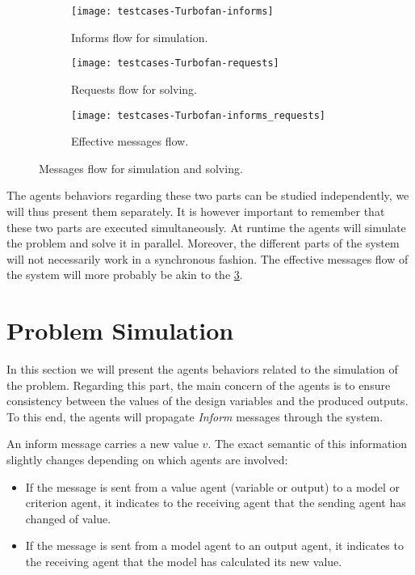 \begin{figure}[h]
	\begin{subfigure}[b]{0.4\textwidth}
		\centering
		\texttt{[image: testcases-Turbofan-informs]}
		\caption{Informs flow for simulation.}\label{messages_flow:inf}
	\end{subfigure}
	\hfill
	\begin{subfigure}[b]{0.4\textwidth}
		\centering
		\texttt{[image: testcases-Turbofan-requests]}
		\caption{Requests flow for solving.}\label{messages_flow:req}
	\end{subfigure}

	\centering
	 \begin{subfigure}[b]{0.4\textwidth}
		\texttt{[image: testcases-Turbofan-informs\_requests]}
		\caption{Effective messages flow.}\label{messages_flow:eff}
	\end{subfigure}
	
	\caption{Messages flow for simulation and solving.}
	\label{messages_flow}

\end{figure}

The agents behaviors regarding these two parts can be studied independently, we will thus present them separately. It is however important to remember that these two parts are executed simultaneously. At runtime the agents will simulate the problem and solve it in parallel. Moreover, the different parts of the system will not necessarily work in a synchronous fashion. The effective messages flow of the system will more probably be akin to the \figurename{} \ref{messages_flow:eff}.

\section{Problem Simulation}

In this section we will present the agents behaviors related to the simulation of the problem. Regarding this part, the main concern of the agents is to ensure consistency between the values of the design variables and the produced outputs. To this end, the agents will propagate \emph{Inform} messages through the system.

An inform message carries a new value $v$. The exact semantic of this information slightly changes depending on which agents are involved:

\begin{itemize}
\item If the message is sent from a value agent (variable or output) to a model or criterion agent, it indicates to the receiving agent that the sending agent has changed of value.

\item If the message is sent from a model agent to an output agent, it indicates to the receiving agent that the model has calculated its new value.
\end{itemize}

